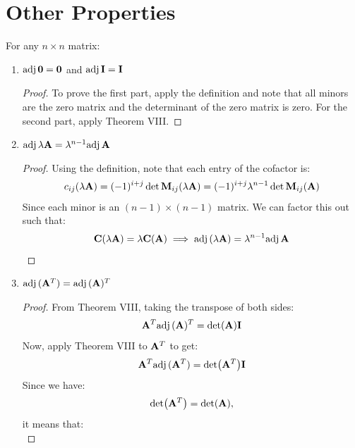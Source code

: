 \documentclass{article}
\begin{document}
    \section{Other Properties}
    For any $n\times n$ matrix:
    \begin{enumerate}
        \item $\mathrm{adj}\,\mathbf{0} = \mathbf{0}$ and $\mathrm{adj}\,\mathbf{I} = \mathbf{I}$
        \begin{proof}
            To prove the first part, apply the definition and note that all minors are the zero matrix and the determinant of the zero matrix is zero. For the second part, apply Theorem VIII.
        \end{proof}
        \item $\mathrm{adj}\,\lambda \mathbf{A} = \lambda^{n-1} \mathrm{adj}\,\mathbf{A}$
        \begin{proof}
            Using the definition, note that each entry of the cofactor is:
            \begin{equation*}
                c_{ij}(\lambda \mathbf{A}) = (-1)^{i+j} \det \mathbf{M}_{ij}(\lambda \mathbf{A}) = (-1)^{i+j} \lambda^{n-1}\det \mathbf{M}_{ij}(\mathbf{A})
            \end{equation*}
            Since each minor is an $(n-1)\times (n-1)$ matrix. We can factor this out such that:
            \begin{equation*}
                \mathbf{C}(\lambda \mathbf{A}) = \lambda \mathbf{C}(\mathbf{A}) \implies \mathrm{adj}\,(\lambda \mathbf{A}) = \lambda^{n-1}\mathrm{adj}\,\mathbf{A}
            \end{equation*}
        \end{proof}
        \item $\mathrm{adj}\,(\mathbf{A}^T) = \mathrm{adj}\,(\mathbf{A})^T$
        \begin{proof}
            From Theorem VIII, taking the transpose of both sides:
            \begin{equation*}
                \mathbf{A}^T\mathrm{adj}\,(\mathbf{A})^T = \det (\mathbf{A})\mathbf{I}
            \end{equation*}
            Now, apply Theorem VIII to $\mathbf{A}^T$ to get:
            \begin{equation*}
                \mathbf{A}^T\mathrm{adj}\,(\mathbf{A}^T) = \det(\mathbf{A}^T)\mathbf{I}
            \end{equation*}
            Since we have:
            \begin{equation*}
                \det(\mathbf{A}^T)=\det(\mathbf{A}),
            \end{equation*}
            it means that:
            \begin{equation*}

\end{equation*}
\end{proof}
\end{enumerate}
\end{document}
